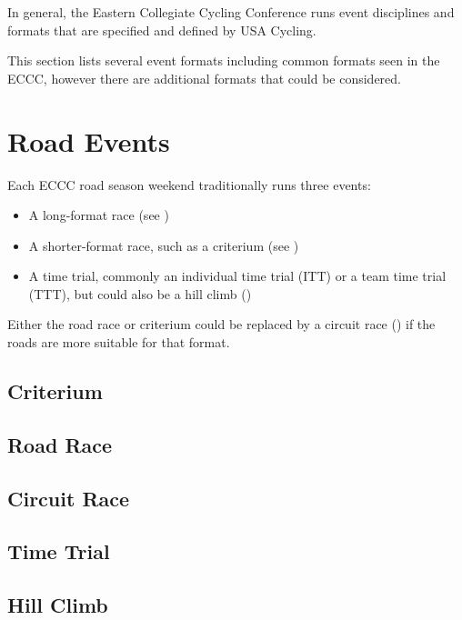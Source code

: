 \documentclass[
  letterpaper, %
  fontsize=10pt, %
  twoside=true,
  chapterentrydots=true, %
  numbers=noenddot,
  fontmethod=tex,
]{kaobook}
\begin{document}
In general, the Eastern Collegiate Cycling Conference
runs event disciplines and formats that are specified and defined by USA Cycling.

This section lists several event formats including
common formats seen in the ECCC, however there are additional
formats that could be considered.

\section{Road Events}

Each ECCC road season weekend traditionally runs three events:

\begin{itemize}
  \item A long-format race (see )
  \item A shorter-format race, such as a criterium (see )
  \item A time trial,
      commonly an individual time trial (ITT)
      or a team time trial (TTT),
      but could also be a hill climb ()
\end{itemize}

Either the road race or criterium could be replaced by a circuit race () if the roads are more suitable for that format.

\subsection{Criterium}

\subsection{Road Race}

\subsection{Circuit Race}

\subsection{Time Trial}

\subsection{Hill Climb}
\end{document}
